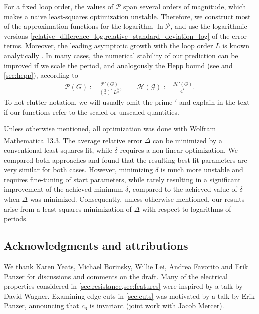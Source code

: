 \documentclass[12pt]{article}
\numberwithin{equation}{section}
\newcommand{\period}{\mathcal P}
\begin{document}
For a fixed loop order, the values of $\period$ span several orders of magnitude, which makes a naive least-squares optimization unstable. Therefore, we construct most of the approximation functions for the logarithm $\ln \period$, and use the logarithmic versions   \cref{relative_difference_log,relative_standard_deviation_log} of the error terms.
Moreover, the leading asymptotic growth with the loop order $L$ is known analytically \cite{mckane_nonperturbative_1984}. In many cases, the numerical stability of our prediction can be improved if we scale the period, and analogously the Hepp bound (see \cite{panzer_hepp_2022} and  \cref{sec:hepp}),   according to
\begin{align}\label{period_scaling}
	\period(G) := \frac{ \period'(G)}{\left( \frac 3 2  \right) ^L L^{\frac 5 2}}, \qquad  \mathcal{H(G)}:= \frac{\mathcal{H}'(G)}{4^L}.
\end{align}
To not clutter notation, we will usually omit the prime $'$ and explain in the text if our functions refer to the scaled or unscaled quantities.

Unless otherwise mentioned, all optimization was done with Wolfram  Mathematica\textsuperscript{\textregistered{}} 13.3. 
The average relative error $\Delta$ can be minimized by a conventional least-squares fit,  while $\delta$ requires a non-linear optimization. We  compared both approaches  and found that the resulting best-fit parameters are very similar for both cases. However, minimizing $\delta$ is much more unstable and requires fine-tuning of start parameters, while rarely resulting in a significant improvement of the achieved minimum $\delta$, compared to the achieved value of $\delta$ when $\Delta$ was minimized. Consequently, unless otherwise mentioned, our results arise from a least-squares minimization of $\Delta$ with respect to logarithms of periods.





\subsection{Acknowledgments and attributions}

We thank Karen Yeats, Michael Borinsky, Willie Lei, Andrea Favorito and Erik Panzer for discussions and comments on the draft.
Many of the electrical properties considered in \cref{sec:resistance,sec:features} were inspired  by a talk by David Wagner. Examining edge cuts in \cref{sec:cuts} was motivated by a talk by Erik Panzer, announcing that $c_6$ is invariant (joint work with Jacob Mercer).
\end{document}
